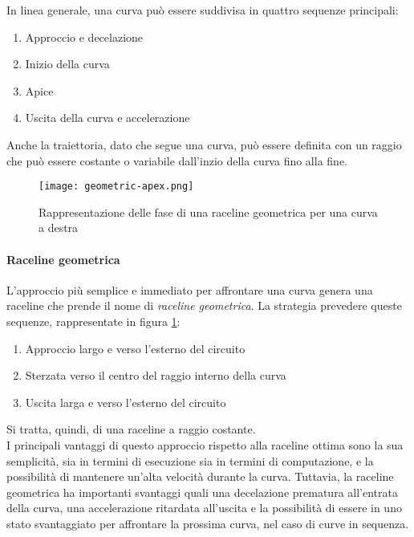 In linea generale, una curva può essere suddivisa in quattro sequenze principali: %
\begin{enumerate}
	\item Approccio e decelazione
	\item Inizio della curva
	\item Apice
	\item Uscita della curva e accelerazione
\end{enumerate}

Anche la traiettoria, dato che segue una curva, può essere definita con un raggio che può essere
costante o variabile dall'inzio della curva fino alla fine.

\begin{figure}[h]
	\begin{center}
		\texttt{[image: geometric-apex.png]}
	\end{center}
	\caption{Rappresentazione delle fase di una raceline geometrica per una curva a destra}\label{fig:geom-raceline}
\end{figure}

\paragraph{Raceline geometrica}
L'approccio più semplice e immediato per affrontare una curva genera una raceline che prende il
nome di \textit{raceline geometrica}. La strategia prevedere queste sequenze, rappresentate in figura
\ref{fig:geom-raceline}:
\begin{enumerate}
	\item Approccio largo e verso l'esterno del circuito 
	\item Sterzata verso il centro del raggio interno della curva 
	\item Uscita larga e verso l'esterno del circuito
\end{enumerate}
Si tratta, quindi, di una raceline a raggio costante.\\
I principali vantaggi di questo approccio rispetto alla raceline ottima sono la sua semplicità, sia in
termini di esecuzione sia in termini di computazione, e la possibilità di mantenere un'alta velocità
durante la curva. Tuttavia, la raceline geometrica ha importanti svantaggi quali una decelazione
prematura all'entrata della curva, una accelerazione ritardata all'uscita e la possibilità di essere in
uno stato svantaggiato per affrontare la prossima curva, nel caso di curve in sequenza.


